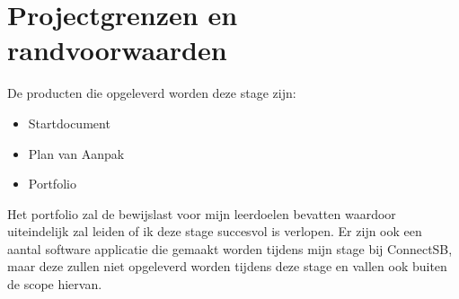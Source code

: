 
\section{Projectgrenzen en randvoorwaarden}
De producten die opgeleverd worden deze stage zijn:
\begin{itemize}
\item Startdocument
\item Plan van Aanpak
\item Portfolio
\end{itemize}

Het portfolio zal de bewijslast voor mijn leerdoelen bevatten waardoor uiteindelijk zal leiden of ik deze stage succesvol is verlopen. Er zijn ook een aantal software applicatie die gemaakt worden tijdens mijn stage bij ConnectSB, maar deze zullen niet opgeleverd worden tijdens deze stage en vallen ook buiten de scope hiervan.

\clearpage

